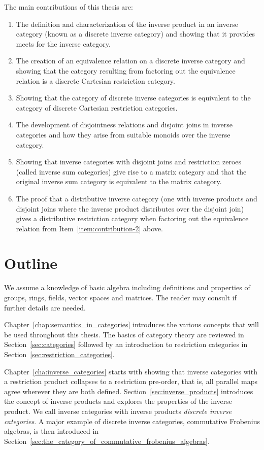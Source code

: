 The main contributions of this thesis are:
\begin{enumerate}
\item The definition and characterization of the inverse product in an inverse category (known as a
  discrete inverse category) and showing  that it provides meets for the inverse category.
\item The creation of an equivalence relation on a discrete inverse category and showing that the
  category resulting from factoring out the equivalence relation is a discrete Cartesian restriction
  category.\label{item:contribution-2}
\item Showing that the category of discrete inverse categories is equivalent to the category of
  discrete Cartesian restriction categories.
\item The development of disjointness relations and disjoint joins in inverse categories and how
  they arise from suitable monoids over the inverse category.
\item Showing that inverse categories with disjoint joins and restriction zeroes (called inverse sum
  categories) give rise to a matrix category and that the original inverse sum category is
  equivalent to the matrix category.
\item The proof that a distributive inverse category (one with inverse products and disjoint joins
  where the inverse product distributes over the disjoint join) gives a distributive restriction
  category when factoring out the equivalence relation from Item~\ref{item:contribution-2} above.
\end{enumerate}

\section{Outline} %
\label{sec:outline}

We assume a knowledge of basic algebra including definitions and properties of groups, rings,
fields, vector spaces and matrices. The reader may consult \cite{lang:algebra} if further details
are needed.

Chapter~\ref{chap:semantics_in_categories} introduces the various concepts that will be used
throughout this thesis. The basics of category theory are reviewed in Section~\ref{sec:categories}
followed by an introduction to restriction categories in
Section~\ref{sec:restriction_categories}.

Chapter~\ref{cha:inverse_categories} starts with showing that inverse categories with a restriction
product collapses to a restriction pre-order, that is, all parallel maps agree wherever they are
both defined. Section~\ref{sec:inverse_products} introduces the concept of inverse products and
explores the properties of the inverse product. We call inverse categories with
inverse products \emph{discrete inverse categories}. A major example of discrete inverse
categories, commutative Frobenius algebras, is then introduced in
Section~\ref{sec:the_category_of_commutative_frobenius_algebras}.

